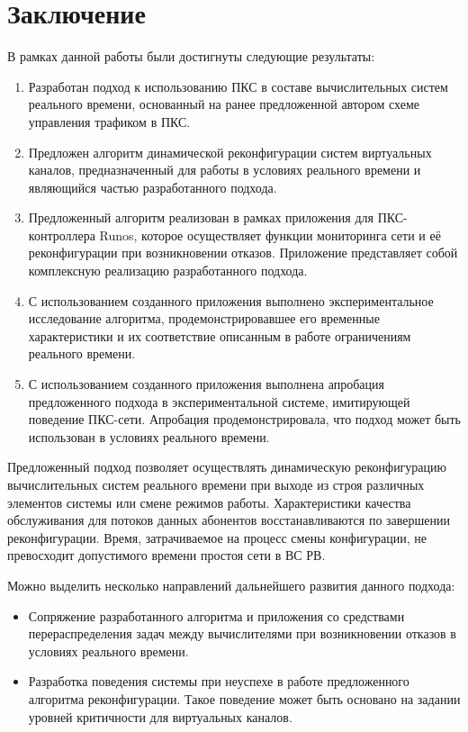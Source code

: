 \documentclass[12pt, a4paper]{article}
\begin{document}
\section*{Заключение}

В рамках данной работы были достигнуты следующие результаты:
\begin{enumerate}
	\item Разработан подход к использованию ПКС в составе вычислительных систем реального времени, основанный на ранее предложенной автором схеме управления трафиком в ПКС.
	\item Предложен алгоритм динамической реконфигурации систем виртуальных каналов, предназначенный для работы в условиях реального времени и являющийся частью разработанного подхода.
	\item Предложенный алгоритм реализован в рамках приложения для ПКС-контроллера Runos, которое осуществляет функции мониторинга сети и её реконфигурации при возникновении отказов. Приложение представляет собой комплексную реализацию разработанного подхода.
	\item С использованием созданного приложения выполнено экспериментальное исследование алгоритма, продемонстрировавшее его временные характеристики и их соответствие описанным в работе ограничениям реального времени.
	\item С использованием созданного приложения выполнена апробация предложенного подхода в экспериментальной системе, имитирующей поведение ПКС-сети. Апробация продемонстрировала, что подход может быть использован в условиях реального времени.
\end{enumerate}

Предложенный подход позволяет осуществлять динамическую реконфигурацию вычислительных систем реального времени при выходе из строя различных элементов системы или смене режимов работы. Характеристики качества обслуживания для потоков данных абонентов восстанавливаются по завершении реконфигурации. Время, затрачиваемое на процесс смены конфигурации, не превосходит допустимого времени простоя сети в ВС РВ.

Можно выделить несколько направлений дальнейшего развития данного подхода:
\begin{itemize}
	\item Сопряжение разработанного алгоритма и приложения со средствами перераспределения задач между вычислителями при возникновении отказов в условиях реального времени.
	\item Разработка поведения системы при неуспехе в работе предложенного алгоритма реконфигурации. Такое поведение может быть основано на задании уровней критичности для виртуальных каналов.
\end{itemize}
\end{document}
